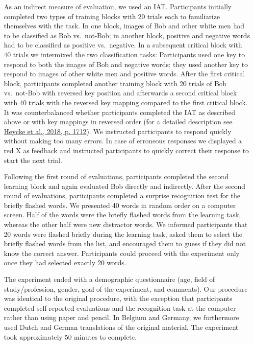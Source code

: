 \documentclass[
  man,floatsintext]{apa6}
\begin{document}
As an indirect measure of evaluation, we used an IAT.
Participants initially completed two types of training blocks with 20 trials each to familiarize themselves with the task.
In one block, images of Bob and other white men had to be classified as Bob vs.~not-Bob; in another block, positive and negative words had to be classified as positive vs.~negative.
In a subsequent critical block with 40 trials we intermixed the two classification tasks:
Participants used one key to respond to both the images of Bob and negative words; they used another key to respond to images of other white men and positive words.
After the first critical block, participants completed another training block with 20 trials of Bob vs.~not-Bob with reversed key position and afterwards a second critical block with 40 trials with the reversed key mapping compared to the first critical block.
It was counterbalanced whether participants completed the IAT as described above or with key mappings in reversed order (for a detailed description see \protect\hyperlink{ref-heycke_two_2018}{Heycke et al., 2018, p. 1712}).
We instructed participants to respond quickly without making too many errors.
In case of erroneous responses we displayed a red X as feedback and instructed participants to quickly correct their response to start the next trial.

Following the first round of evaluations, participants completed the second learning block and again evaluated Bob directly and indirectly.
After the second round of evaluations, participants completed a surprise recognition test for the briefly flashed words.
We presented 40 words in random order on a computer screen.
Half of the words were the briefly flashed words from the learning task, whereas the other half were new distractor words.
We informed participants that 20 words were flashed briefly during the learning task, asked them to select the briefly flashed words from the list, and encouraged them to guess if they did not know the correct answer.
Participants could proceed with the experiment only once they had selected exactly 20 words.

The experiment ended with a demographic questionnaire (age, field of study/profession, gender, goal of the experiment, and comments).
Our procedure was identical to the original procedure, with the exception that participants completed self-reported evaluations and the recognition task at the computer rather than using paper and pencil.
In Belgium and Germany, we furthermore used Dutch and German translations of the original material.
The experiment took approximately 50 minutes to complete.
\end{document}
